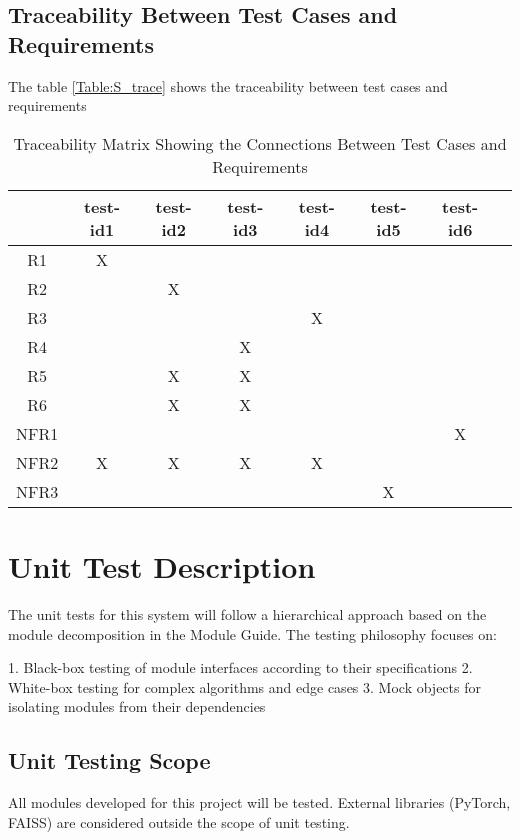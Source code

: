 \documentclass[12pt, titlepage]{article}
\begin{document}
\subsection{Traceability Between Test Cases and Requirements}

The table \ref{Table:S_trace}
 shows the traceability between test cases and requirements

\begin{table}[h!]\label{Table:S_trace}
  \centering
  \begin{tabular}{|c|c|c|c|c|c|c|c|}
  \hline
    & test-id1& test-id2& test-id3&test-id4&test-id5&test-id6 \\
  \hline
  R1        & X&  & & & & \\ \hline
  R2        & & X& & & & \\ \hline
  R3        & & & &X& &\\ \hline
  R4        & & & X& & &\\ \hline
  R5        & &X & X& & &\\ \hline
  R6        & &X & X& & &\\ \hline
  NFR1      & & & & & &X\\ \hline
  NFR2      &X & X& X& X& &\\ \hline
  NFR3      & & & & &X&\\ \hline
  \end{tabular}
  \caption{Traceability Matrix Showing the Connections Between Test Cases and Requirements}
  \label{Table:A_trace}
  \end{table}

\section{Unit Test Description}\label{UnitTest}

The unit tests for this system will follow a hierarchical approach based on the module decomposition in the Module Guide. The testing philosophy focuses on:

1. Black-box testing of module interfaces according to their specifications
2. White-box testing for complex algorithms and edge cases
3. Mock objects for isolating modules from their dependencies

\subsection{Unit Testing Scope}
All modules developed for this project will be tested. External libraries (PyTorch, FAISS) are considered outside the scope of unit testing.
\end{document}
